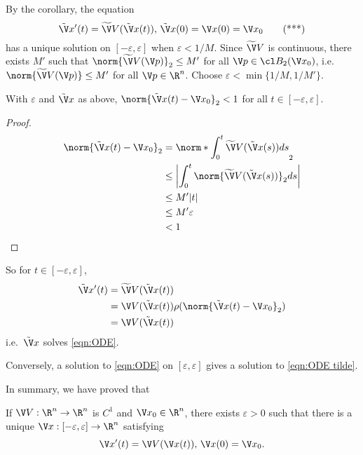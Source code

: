 \documentclass[a4paper]{article}
\theoremstyle{definition}
\begin{document}
By the corollary, the equation
\begin{equation*}
  \label{eqn:ODE tilde}
  \tilde \V x'(t) = \widetilde \V V(\tilde \V x(t)), \, \tilde \V x(0) = \V x(0) = \V x_0
  \tag{***}
\end{equation*}
has a unique solution on \([-\varepsilon, \varepsilon]\) when \(\varepsilon < 1/M\). Since \(\widetilde \V V\) is continuous, there exists \(M'\) such that \(\norm{\widetilde \V V(\V p)}_2 \leq M'\) for all \(\V p \in \cl B_2(\V x_0)\), i.e.\ \(\norm{\widetilde \V V(\V p)} \leq M'\) for all \(\V p \in \R^n\). Choose \(\varepsilon < \min\{1/M, 1/M'\}\).

\begin{lemma}
  With \(\varepsilon\) and \(\tilde \V x\) as above, \(\norm{\tilde \V x(t) - \V x_0}_2 < 1\) for all \(t \in [-\varepsilon, \varepsilon]\).
\end{lemma}

\begin{proof}
  \begin{align*}
    \norm{\tilde \V x(t) - \V x_0}_2 &= \norm*{\int_0^t \widetilde \V V(\tilde \V x(s)) ds}_2 \\
                                     &\leq \left| \int_0^t \norm{\widetilde \V V(\tilde \V x(s))}_2 ds \right| \\
                                     &\leq M'|t| \\
                                     &\leq M'\varepsilon \\
                                     &< 1
  \end{align*}
\end{proof}

So for \(t \in [-\varepsilon, \varepsilon]\),
\begin{align*}
  \tilde \V x'(t) &= \widetilde \V V(\tilde \V x(t)) \\
                  &= \V V(\tilde \V x(t)) \rho(\norm{\tilde \V x(t) - \V x_0}_2) \\
                  &= \V V(\tilde \V x(t))
\end{align*}
i.e.\ \(\tilde \V x\) solves \eqref{eqn:ODE}.

Conversely, a solution to \eqref{eqn:ODE} on \([\varepsilon, \varepsilon]\) gives a solution to \eqref{eqn:ODE tilde}.

In summary, we have proved that

\begin{theorem}
  If \(\V V: \R^n \to \R^n\) is \(C^1\) and \(\V x_0 \in \R^n\), there exists \(\varepsilon > 0\) such that there is a unique \(\V x: [-\varepsilon, \varepsilon] \to \R^n\) satisfying
  \[
    \V x'(t) = \V V(\V x(t)), \, \V x(0) = \V x_0.
  \]
\end{theorem}
\end{document}
